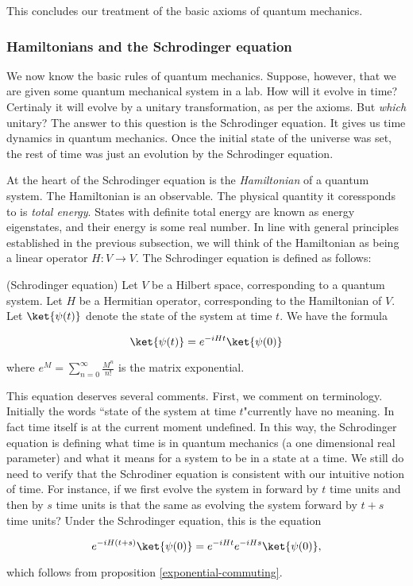 This concludes our treatment of the basic axioms of quantum mechanics.

\subsubsection{Hamiltonians and the Schrodinger equation}

We now know the basic rules of quantum mechanics. Suppose, however, that we are given some quantum mechanical system in a lab. How will it evolve in time? Certinaly it will evolve by a unitary transformation, as per the axioms. But {\em which} unitary? The answer to this question is the Schrodinger equation. It gives us time dynamics in quantum mechanics. Once the initial state of the universe was set, the rest of time was just an evolution by the Schrodinger equation. 

At the heart of the Schrodinger equation is the {\em Hamiltonian} of a quantum system. The Hamiltonian is an observable. The physical quantity it coressponds to is {\em total energy}. States with definite total energy are known as energy eigenstates, and their energy is some real number. In line with general principles established in the previous subsection, we will think of the Hamiltonian as being a linear operator $H:V\to V$. The Schrodinger equation is defined as follows:

\begin{defn} (Schrodinger equation) Let $V$ be a Hilbert space, corresponding to a quantum system. Let $H$ be a Hermitian operator, corresponding to the Hamiltonian of $V$. Let $\ket{\psi(t)}$ denote the state of the system at time $t$. We have the formula

$$\ket{\psi(t)}=e^{-i H t}\ket{\psi(0)}$$

where $e^M=\sum_{n=0}^{\infty}\frac{M^n}{n!}$ is the matrix exponential.

\raggedleft\qedsymbol{}
\end{defn}

\begin{rem}
This equation deserves several comments. First, we comment on terminology. Initially the words ``state of the system at time $t$"currently have no meaning. In fact time itself is at the current moment undefined. In this way, the Schrodinger equation is defining what time is in quantum mechanics (a one dimensional real parameter) and what it means for a system to be in a state at a time. We still do need to verify that the Schrodiner equation is consistent with our intuitive notion of time. For instance, if we first evolve the system in forward by $t$ time units and then by $s$ time units is that the same as evolving the system forward by $t+s$ time units? Under the Schrodinger equation, this is the equation

$$e^{-i H (t+s)}\ket{\psi(0)}=e^{- i H t} e^{- i H s}\ket{\psi(0)},$$

which follows from proposition \ref{exponential-commuting}.
\end{rem}

